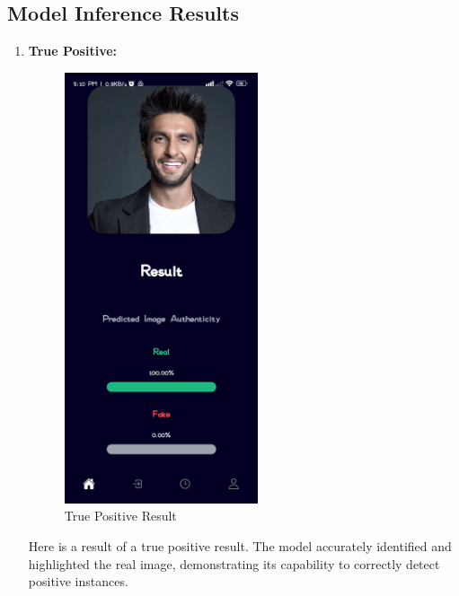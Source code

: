 \subsection{Model Inference Results }
\begin{enumerate}
    \item \textbf{True Positive:}
          \\

          \begin{figure}[ht]
              \centering
              \includegraphics[height =5in  ]{img/ranveerResult.jpg}
              \caption{{True Positive Result}}
          \end{figure}

          Here is a result of a true positive result. The model accurately identified and highlighted the real image, demonstrating its capability to correctly detect positive instances.


\end{enumerate}
